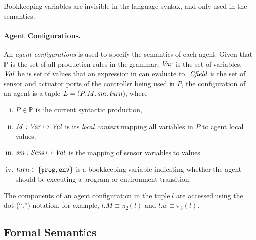 Bookkeeping variables are invisible in the language syntax, and only used in the semantics.


\paragraph{Agent Configurations.}

An \emph{agent configurations} is used to specify the semantics of each agent.
Given that $\mathbb{P}$ is the set of all production rules in the \lgname grammar,
$\mathit{Var}$ is the set of variables, $\mathit{Val}$ be is set of values that an expression in \lgname can evaluate to,
$\mathit{Cfield}$ is the set of sensor and actuator ports of the controller being used in $P$,
the configuration of an agent is a tuple $L = (P, {M},\mathit{sm},\mathit{turn})$, where

\begin{enumerate}[i)]
\item $P \in \mathbb{P}$ is the current syntactic production,
\item ${M} : \mathit{Var} \mapsto \mathit{Val}$ is its {\em local context\/} mapping all variables in $P$ to agent local values.
\item $\mathit{sm} : \mathit{Sens} \mapsto \mathit{Val}$ is the mapping of sensor variables to values.
\item $\mathit{turn} \in \{\mathtt{prog,env}\}$ is a bookkeeping variable indicating whether the agent should be executing a program or environment transition.
\end{enumerate}

The components of an agent configuration in the tuple $l$ are accessed
using the dot (``$.$'') notation, for example, $l.M\equiv \pi_2(l)$ and $l.w \equiv \pi_3(l)$.


\subsection{Formal Semantics}\label{sec:semantics}


